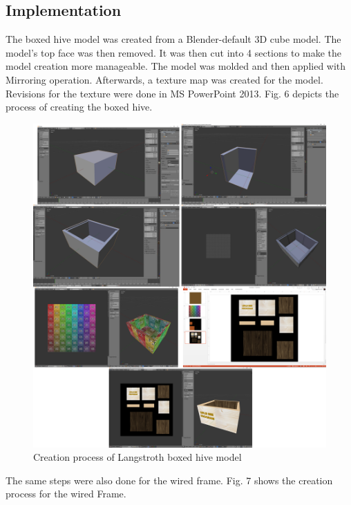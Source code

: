 \documentclass[journal]{./IEEE/IEEEtran}
\begin{document}
\subsection{Implementation}
\indent The boxed hive model was created from a Blender-default 3D cube model. The model's top face was then removed. It was then cut into 4 sections to make the model creation more manageable. The model was molded and then applied with Mirroring operation. Afterwards, a texture map was created for the model. Revisions for the texture were done in MS PowerPoint 2013. Fig. 6 depicts the process of creating the boxed hive.
\begin{figure}[H]
\includegraphics[scale=0.275]{./images/boxed-hive-model.png}
\centering
\caption{Creation process of Langstroth boxed hive model}
\centering
\end{figure}
\indent The same steps were also done for the wired frame. Fig. 7 shows the creation process for the wired Frame.
\end{document}
